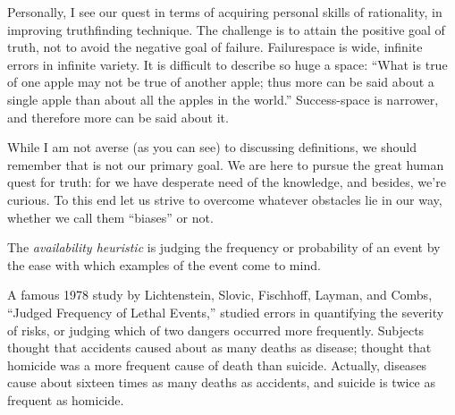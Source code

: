 {
 Personally, I see our quest in terms of acquiring personal skills
of rationality, in improving truthfinding technique. The challenge is
to attain the positive goal of truth, not to avoid the negative goal of
failure. Failurespace is wide, infinite errors in infinite variety. It
is difficult to describe so huge a space: ``What is
true of one apple may not be true of another apple; thus more can be
said about a single apple than about all the apples in the
world.'' Success-space is narrower, and therefore
more can be said about it.}

{
 While I am not averse (as you can see) to discussing definitions,
we should remember that is not our primary goal. We are here to pursue
the great human quest for truth: for we have desperate need of the
knowledge, and besides, we're curious. To this end let
us strive to overcome whatever obstacles lie in our way, whether we
call them ``biases'' or not.}

\myendsectiontext


{
 The \textit{availability heuristic} is judging the frequency or
probability of an event by the ease with which examples of the event
come to mind. }

{
 A famous 1978 study by Lichtenstein, Slovic, Fischhoff, Layman,
and Combs, ``Judged Frequency of Lethal
Events,'' studied errors in quantifying the severity
of risks, or judging which of two dangers occurred more
frequently. Subjects thought that accidents caused
about as many deaths as disease; thought that homicide was a more
frequent cause of death than suicide. Actually, diseases cause about
sixteen times as many deaths as accidents, and suicide is twice as
frequent as homicide.}

